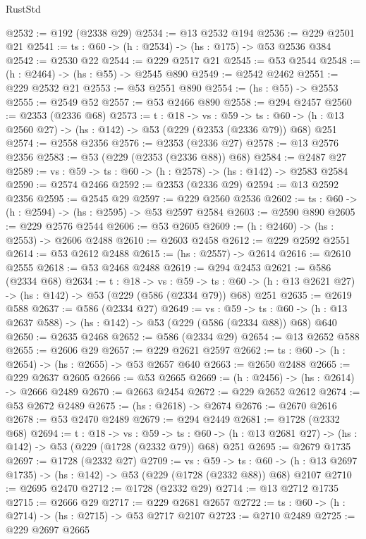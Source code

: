 \begin{lexlean}{RustStd}
\begin{coremodule}
@2532 := @192 (@2338 @29)
@2534 := @13 @2532 @194
@2536 := @229 @2501 @21
@2541 := {ts : @60} -> (h : @2534) -> (hs : @175) -> @53 @2536 @384
@2542 := @2530 @22
@2544 := @229 @2517 @21
@2545 := @53 @2544
@2548 := (h : @2464) -> (hs : @55) -> @2545 @890
@2549 := @2542 @2462
@2551 := @229 @2532 @21
@2553 := @53 @2551 @890
@2554 := (hs : @55) -> @2553
@2555 := @2549 @52
@2557 := @53 @2466 @890
@2558 := @294 @2457
@2560 := @2353 (@2336 @68)
@2573 := {t : @18} ->
  {vs : @59} ->
  {ts : @60} -> (h : @13 @2560 @27) -> (hs : @142) -> @53 (@229 (@2353 (@2336 @79)) @68) @251
@2574 := @2558 @2356
@2576 := @2353 (@2336 @27)
@2578 := @13 @2576 @2356
@2583 := @53 (@229 (@2353 (@2336 @88)) @68)
@2584 := @2487 @27
@2589 := {vs : @59} -> {ts : @60} -> (h : @2578) -> (hs : @142) -> @2583 @2584
@2590 := @2574 @2466
@2592 := @2353 (@2336 @29)
@2594 := @13 @2592 @2356
@2595 := @2545 @29
@2597 := @229 @2560 @2536
@2602 := {ts : @60} -> (h : @2594) -> (hs : @2595) -> @53 @2597 @2584
@2603 := @2590 @890
@2605 := @229 @2576 @2544
@2606 := @53 @2605
@2609 := (h : @2460) -> (hs : @2553) -> @2606 @2488
@2610 := @2603 @2458
@2612 := @229 @2592 @2551
@2614 := @53 @2612 @2488
@2615 := (hs : @2557) -> @2614
@2616 := @2610 @2555
@2618 := @53 @2468 @2488
@2619 := @294 @2453
@2621 := @586 (@2334 @68)
@2634 := {t : @18} ->
  {vs : @59} ->
  {ts : @60} -> (h : @13 @2621 @27) -> (hs : @142) -> @53 (@229 (@586 (@2334 @79)) @68) @251
@2635 := @2619 @588
@2637 := @586 (@2334 @27)
@2649 := {vs : @59} ->
  {ts : @60} -> (h : @13 @2637 @588) -> (hs : @142) -> @53 (@229 (@586 (@2334 @88)) @68) @640
@2650 := @2635 @2468
@2652 := @586 (@2334 @29)
@2654 := @13 @2652 @588
@2655 := @2606 @29
@2657 := @229 @2621 @2597
@2662 := {ts : @60} -> (h : @2654) -> (hs : @2655) -> @53 @2657 @640
@2663 := @2650 @2488
@2665 := @229 @2637 @2605
@2666 := @53 @2665
@2669 := (h : @2456) -> (hs : @2614) -> @2666 @2489
@2670 := @2663 @2454
@2672 := @229 @2652 @2612
@2674 := @53 @2672 @2489
@2675 := (hs : @2618) -> @2674
@2676 := @2670 @2616
@2678 := @53 @2470 @2489
@2679 := @294 @2449
@2681 := @1728 (@2332 @68)
@2694 := {t : @18} ->
  {vs : @59} ->
  {ts : @60} -> (h : @13 @2681 @27) -> (hs : @142) -> @53 (@229 (@1728 (@2332 @79)) @68) @251
@2695 := @2679 @1735
@2697 := @1728 (@2332 @27)
@2709 := {vs : @59} ->
  {ts : @60} -> (h : @13 @2697 @1735) -> (hs : @142) -> @53 (@229 (@1728 (@2332 @88)) @68) @2107
@2710 := @2695 @2470
@2712 := @1728 (@2332 @29)
@2714 := @13 @2712 @1735
@2715 := @2666 @29
@2717 := @229 @2681 @2657
@2722 := {ts : @60} -> (h : @2714) -> (hs : @2715) -> @53 @2717 @2107
@2723 := @2710 @2489
@2725 := @229 @2697 @2665

\end{coremodule}
\end{lexlean}
